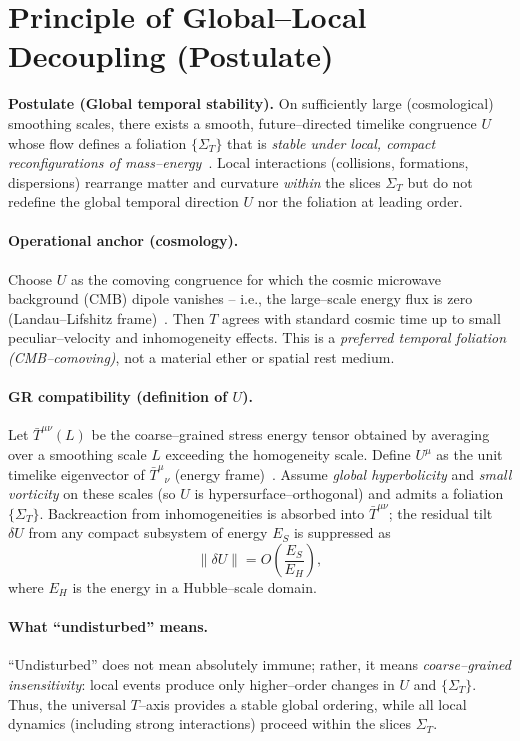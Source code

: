 \documentclass[12pt]{article}
\theoremstyle{plain}
\begin{document}
\section{Principle of Global–Local Decoupling (Postulate)}
\label{sec:principle-global-decoupling}
\textbf{Postulate (Global temporal stability).} On sufficiently large (cosmological) smoothing scales, there exists a smooth, future–directed timelike congruence \(U\) whose flow defines a foliation \(\{\Sigma_T\}\) that is \emph{stable under local, compact reconfigurations of mass–energy}~\cite{Carroll2004}. Local interactions (collisions, formations, dispersions) rearrange matter and curvature \emph{within} the slices \(\Sigma_T\) but do not redefine the global temporal direction \(U\) nor the foliation at leading order.

\paragraph{Operational anchor (cosmology).}
Choose \(U\) as the comoving congruence for which the cosmic microwave background (CMB) dipole vanishes – i.e., the large–scale energy flux is zero (Landau–Lifshitz frame)~\cite{Rindler2006}. Then \(T\) agrees with standard cosmic time up to small peculiar–velocity and inhomogeneity effects. This is a \emph{preferred temporal foliation (CMB–comoving)}, not a material ether or spatial rest medium.

\paragraph{GR compatibility (definition of \(U\)).}
Let \(\bar T^{\mu\nu}(L)\) be the coarse–grained stress energy tensor obtained by averaging over a smoothing scale \(L\) exceeding the homogeneity scale. Define \(U^\mu\) as the unit timelike eigenvector of \(\bar T^{\mu}{}_{\nu}\) (energy frame)~\cite{Carroll2004}. Assume \emph{global hyperbolicity} and \emph{small vorticity} on these scales (so \(U\) is hypersurface–orthogonal) and admits a foliation \(\{\Sigma_T\}\). Backreaction from inhomogeneities is absorbed into \(\bar T^{\mu\nu}\); the residual tilt \(\delta U\) from any compact subsystem of energy \(E_S\) is suppressed as
\begin{equation}
\|\delta U\| = O\!\left(\frac{E_S}{E_H}\right),
\label{eq:deltaU}
\end{equation}
where \(E_H\) is the energy in a Hubble–scale domain.

\paragraph{What “undisturbed” means.}
“Undisturbed” does not mean absolutely immune; rather, it means \emph{coarse–grained insensitivity}: local events produce only higher–order changes in \(U\) and \(\{\Sigma_T\}\). Thus, the universal \(T\)–axis provides a stable global ordering, while all local dynamics (including strong interactions) proceed within the slices \(\Sigma_T\).
\end{document}
